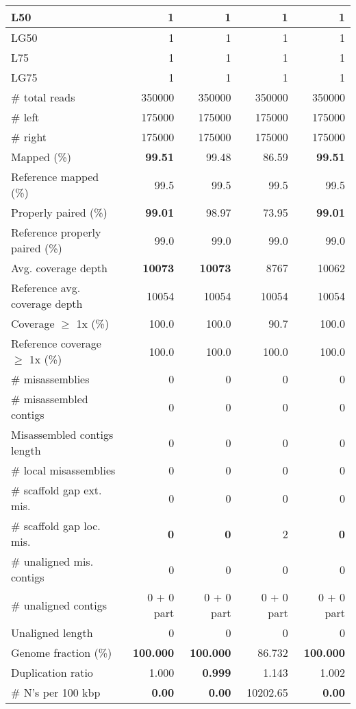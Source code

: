 \documentclass[12pt,a4paper]{article}
\begin{document}
\begin{table}[ht]
\begin{center}
\begin{tabular}{|l*{4}{|r}|}
L50 & 1 & 1 & 1 & 1 \\ \hline
LG50 & 1 & 1 & 1 & 1 \\ \hline
L75 & 1 & 1 & 1 & 1 \\ \hline
LG75 & 1 & 1 & 1 & 1 \\ \hline
\# total reads & 350000 & 350000 & 350000 & 350000 \\ \hline
\# left & 175000 & 175000 & 175000 & 175000 \\ \hline
\# right & 175000 & 175000 & 175000 & 175000 \\ \hline
Mapped (\%) & {\bf 99.51} & 99.48 & 86.59 & {\bf 99.51} \\ \hline
Reference mapped (\%) & 99.5 & 99.5 & 99.5 & 99.5 \\ \hline
Properly paired (\%) & {\bf 99.01} & 98.97 & 73.95 & {\bf 99.01} \\ \hline
Reference properly paired (\%) & 99.0 & 99.0 & 99.0 & 99.0 \\ \hline
Avg. coverage depth & {\bf 10073} & {\bf 10073} & 8767 & 10062 \\ \hline
Reference avg. coverage depth & 10054 & 10054 & 10054 & 10054 \\ \hline
Coverage $\geq$ 1x (\%) & 100.0 & 100.0 & 90.7 & 100.0 \\ \hline
Reference coverage $\geq$ 1x (\%) & 100.0 & 100.0 & 100.0 & 100.0 \\ \hline
\# misassemblies & 0 & 0 & 0 & 0 \\ \hline
\# misassembled contigs & 0 & 0 & 0 & 0 \\ \hline
Misassembled contigs length & 0 & 0 & 0 & 0 \\ \hline
\# local misassemblies & 0 & 0 & 0 & 0 \\ \hline
\# scaffold gap ext. mis. & 0 & 0 & 0 & 0 \\ \hline
\# scaffold gap loc. mis. & {\bf 0} & {\bf 0} & 2 & {\bf 0} \\ \hline
\# unaligned mis. contigs & 0 & 0 & 0 & 0 \\ \hline
\# unaligned contigs & 0 + 0 part & 0 + 0 part & 0 + 0 part & 0 + 0 part \\ \hline
Unaligned length & 0 & 0 & 0 & 0 \\ \hline
Genome fraction (\%) & {\bf 100.000} & {\bf 100.000} & 86.732 & {\bf 100.000} \\ \hline
Duplication ratio & 1.000 & {\bf 0.999} & 1.143 & 1.002 \\ \hline
\# N's per 100 kbp & {\bf 0.00} & {\bf 0.00} & 10202.65 & {\bf 0.00} \\ \hline

\end{tabular}
\end{center}
\end{table}
\end{document}
